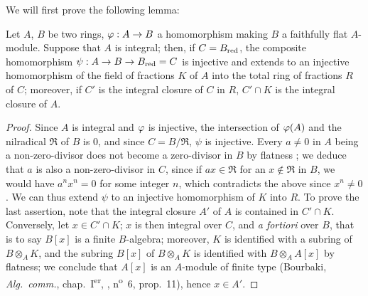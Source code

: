 We will first prove the following lemma:

\begin{lemma}[23.2.7.1]
\label{0.23.2.7.1}
Let $A$, $B$ be two rings, $\varphi:A\to B$ a homomorphism making $B$ a faithfully flat $A$-module.
Suppose that $A$ is integral; then, if $C=B_{\mathrm{red}}$, the composite homomorphism $\psi:A\to B\to B_{\mathrm{red}}=C$ is injective and extends to an injective homomorphism of the field of fractions $K$ of $A$ into the total ring of fractions $R$ of $C$; moreover, if $C'$ is the integral closure of $C$ in $R$, $C'\cap K$ is the integral closure of $A$.
\end{lemma}

\begin{proof}
Since $A$ is integral and $\varphi$ is injective, the intersection of $\varphi(A)$ and the nilradical $\mathfrak{R}$ of $B$ is $0$, and since $C=B/\mathfrak{R}$, $\psi$ is injective.
Every $a\neq 0$ in $A$ being a non-zero-divisor does not become a zero-divisor in $B$ by flatness ; we deduce that $a$ is also a non-zero-divisor in $C$, since if $ax\in\mathfrak{R}$ for an $x\notin\mathfrak{R}$ in $B$, we would have $a^nx^n=0$ for some integer $n$, which contradicts the above since $x^n\neq 0$.
We can thus extend $\psi$ to an injective homomorphism of $K$ into $R$.
To prove the last assertion, note that the integral closure $A'$ of $A$ is contained in $C'\cap K$.
Conversely, let $x\in C'\cap K$; $x$ is then integral over $C$, and \emph{a fortiori} over $B$, that is to say $B[x]$ is a finite $B$-algebra; moreover, $K$ is identified with a subring of $B\otimes_A K$, and the subring $B[x]$ of $B\otimes_A K$ is identified with $B\otimes_A A[x]$ by flatness; we conclude that $A[x]$ is an $A$-module of finite type (Bourbaki, \emph{Alg.~comm.}, chap.~I\textsuperscript{er}, , n\textsuperscript{o}~6, prop.~11), hence $x\in A'$.
\end{proof}


